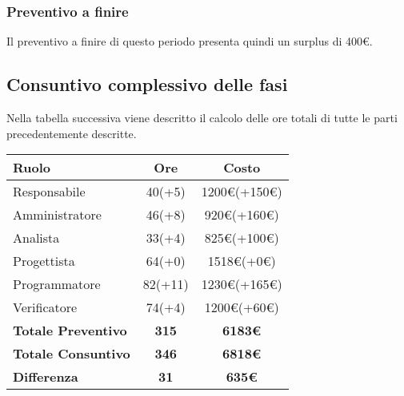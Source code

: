{{{{{{{{{{{\subsubsection{Preventivo a finire}\label{ConsuntivoTerzoPeriodoDiProgettazioneDiDettaglioCodificaPreventivoFinire}
Il preventivo a finire di questo periodo presenta quindi un surplus di 400\euro.

\subsection{Consuntivo complessivo delle fasi}\label{ConsuntivoPeriodoDiProgettazioneDettaglioCodificaComplessivoDelleFasi}

			Nella tabella successiva viene descritto il calcolo delle ore totali di tutte le parti precedentemente descritte.

			\quad
			\def\tabularxcolumn#1{m{#1}}
			{
				\begin{center}
					\renewcommand{\arraystretch}{1.4}
					\begin{tabularx}{10cm}{|X|c|c|}
						\hline
						\rowcolor{airforceblue}
						\textbf{Ruolo} & \textbf{Ore} & \textbf{Costo}\\
						\hline
						Responsabile & 40(+5) & 1200\euro(+150\euro)\\
						\hline
						Amministratore & 46(+8) & 920\euro(+160\euro)\\
						\hline
						Analista & 33(+4) & 825\euro(+100\euro)\\
						\hline
						Progettista & 64(+0) & 1518\euro(+0\euro)\\
						\hline
						Programmatore & 82(+11) & 1230\euro(+165\euro)\\
						\hline
						Verificatore & 74(+4) & 1200\euro(+60\euro)\\
						\hline
						\textbf{Totale Preventivo} & \textbf{315} & \textbf{6183\euro}\\
						\hline
						\textbf{Totale Consuntivo} & \textbf{346} & \textbf{6818\euro}\\
						\hline
						\textbf{Differenza} & \textbf{31} & \textbf{635\euro}
					\end{tabularx}
				\end{center}

}}}}}}}}}}}}
